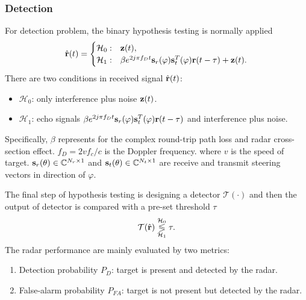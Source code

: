 \subsubsection{Detection}
For detection problem, the binary hypothesis testing is normally applied \cite{liu2020tutorial}
\begin{equation}\label{eqn:hypothesis_testing}
    \hat{\bf r}(t) = \begin{cases} 
        \mathcal{H}_0: & {\bf z}(t),\\
        \mathcal{H}_1: & \beta e^{2j\pi f_D t}{\bf s}_r(\varphi) {\bf s}_t^T(\varphi){\bf r}(t - \tau) + {\bf z}(t).
    \end{cases}
\end{equation}
There are two conditions in received signal $\hat{\bf r}(t)$: 
\begin{itemize}
    \item $\mathcal{H}_0$: only interference plus noise ${\bf z}(t)$.
    \item $\mathcal{H}_1$: echo signals $\beta e^{2j\pi f_D t}{\bf s}_r(\varphi) {\bf s}_t^T(\varphi){\bf r}(t - \tau)$ and interference plus noise.
\end{itemize}
Specifically, $\beta$ represents for the complex round-trip path loss and radar cross-section effect. $f_D = 2vf_c / c$ is the Doppler frequency. 
where $v$ is the speed of target.
${\bf s}_r(\theta) \in \mathbb{C}^{N_r \times 1}$ and ${\bf s}_t(\theta) \in \mathbb{C}^{N_t \times 1}$ are receive and transmit steering vectors
in direction of $\varphi$.

The final step of hypothesis testing is designing a detector $\mathcal{T}(\cdot)$ and then the output of detector is compared 
with a pre-set threshold $\tau$
\begin{equation} \label{eqn:radar-detection}
    \mathcal{T}(\hat{\bf r}) \underset{\mathcal{H}_1}{\overset{\mathcal{H}_0}{\lessgtr} } \tau.
\end{equation}
The radar performance are mainly evaluated by two metrics:
\begin{enumerate}
    \item Detection probability $P_D$: target is present and detected by the radar.
    \item False-alarm probability $P_{FA}$: target is not present but detected by the radar.
\end{enumerate}

